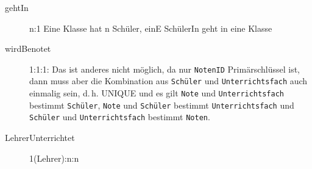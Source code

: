 \documentclass{lehramt-informatik-aufgabe}
\begin{document}
\begin{antwort}

\begin{description}
\item[gehtIn] n:1 Eine Klasse hat n Schüler, einE SchülerIn geht in eine
Klasse

\item[wirdBenotet]  1:1:1: Das ist anderes nicht möglich, da nur
\texttt{NotenID} Primärschlüssel ist, dann muss aber die Kombination aus
\texttt{Schüler} und \texttt{Unter\-richtsfach} auch einmalig sein, d.\,h.
UNIQUE und es gilt \texttt{Note} und \texttt{Unter\-richtsfach} bestimmt
\texttt{Schüler}, \texttt{Note} und \texttt{Schüler} bestimmt
\texttt{Unterrichtsfach} und \texttt{Schüler} und
\texttt{Unterrichtsfach} bestimmt
\texttt{Noten}.

\item[LehrerUnterrichtet] 1(Lehrer):n:n
\end{description}
\end{antwort}
\end{document}
